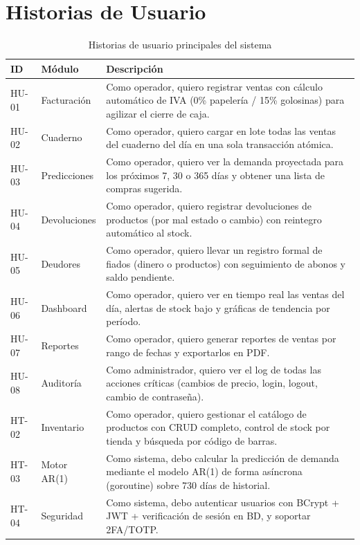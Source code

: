 \documentclass[12pt,a4paper,oneside]{report}
\begin{document}
\section{Historias de Usuario}

\begin{table}[H]
\centering
\caption{Historias de usuario principales del sistema}
\begin{tabularx}{\textwidth}{|l|l|X|}
\hline
\rowcolor{lightgray}
\textbf{ID} & \textbf{Módulo} & \textbf{Descripción} \\
\hline
HU-01 & Facturación & Como operador, quiero registrar ventas con cálculo automático de IVA (0\% papelería / 15\% golosinas) para agilizar el cierre de caja. \\
\hline
HU-02 & Cuaderno & Como operador, quiero cargar en lote todas las ventas del cuaderno del día en una sola transacción atómica. \\
\hline
HU-03 & Predicciones & Como operador, quiero ver la demanda proyectada para los próximos 7, 30 o 365 días y obtener una lista de compras sugerida. \\
\hline
HU-04 & Devoluciones & Como operador, quiero registrar devoluciones de productos (por mal estado o cambio) con reintegro automático al stock. \\
\hline
HU-05 & Deudores & Como operador, quiero llevar un registro formal de fiados (dinero o productos) con seguimiento de abonos y saldo pendiente. \\
\hline
HU-06 & Dashboard & Como operador, quiero ver en tiempo real las ventas del día, alertas de stock bajo y gráficas de tendencia por período. \\
\hline
HU-07 & Reportes & Como operador, quiero generar reportes de ventas por rango de fechas y exportarlos en PDF. \\
\hline
HU-08 & Auditoría & Como administrador, quiero ver el log de todas las acciones críticas (cambios de precio, login, logout, cambio de contraseña). \\
\hline
HT-02 & Inventario & Como operador, quiero gestionar el catálogo de productos con CRUD completo, control de stock por tienda y búsqueda por código de barras. \\
\hline
HT-03 & Motor AR(1) & Como sistema, debo calcular la predicción de demanda mediante el modelo AR(1) de forma asíncrona (goroutine) sobre 730 días de historial. \\
\hline
HT-04 & Seguridad & Como sistema, debo autenticar usuarios con BCrypt + JWT + verificación de sesión en BD, y soportar 2FA/TOTP. \\
\hline
\end{tabularx}
\label{tab:historias}
\end{table}
\end{document}
